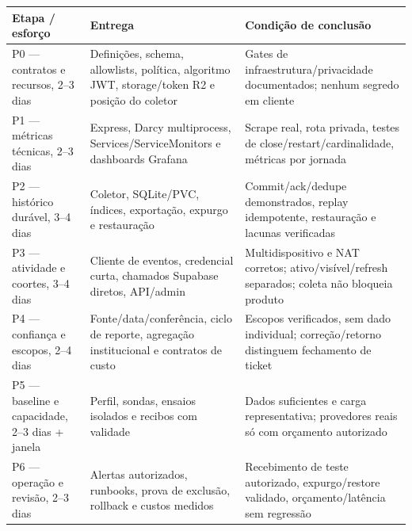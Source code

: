\documentclass[10pt,a4paper]{article}
\begin{document}
{\def\LTcaptype{none} %
\small
{}
\begin{longtable}[]{@{}
  >{\raggedright\arraybackslash}p{}
  >{\raggedright\arraybackslash}p{}
  >{\raggedright\arraybackslash}p{}@{}}
\toprule\noalign{}
\rowcolor{NFAccent}
\begin{minipage}[b]{\linewidth}\raggedright
Etapa / esforço
\end{minipage} & \begin{minipage}[b]{\linewidth}\raggedright
Entrega
\end{minipage} & \begin{minipage}[b]{\linewidth}\raggedright
Condição de conclusão
\end{minipage} \\
\midrule\noalign{}
\endhead
\bottomrule\noalign{}
\endlastfoot
P0 --- contratos e recursos, 2--3 dias & Definições, schema, allowlists,
política, algoritmo JWT, storage/token R2 e posição do coletor & Gates
de infraestrutura/privacidade documentados; nenhum segredo em cliente \\
P1 --- métricas técnicas, 2--3 dias & Express, Darcy multiprocess,
Services/ServiceMonitors e dashboards Grafana & Scrape real, rota
privada, testes de close/restart/cardinalidade, métricas por jornada \\
P2 --- histórico durável, 3--4 dias & Coletor, SQLite/PVC, índices,
exportação, expurgo e restauração & Commit/ack/dedupe demonstrados,
replay idempotente, restauração e lacunas verificadas \\
P3 --- atividade e coortes, 3--4 dias & Cliente de eventos, credencial
curta, chamados Supabase diretos, API/admin & Multidispositivo e NAT
corretos; ativo/visível/refresh separados; coleta não bloqueia
produto \\
P4 --- confiança e escopos, 2--4 dias & Fonte/data/conferência, ciclo de
reporte, agregação institucional e contratos de custo & Escopos
verificados, sem dado individual; correção/retorno distinguem fechamento
de ticket \\
P5 --- baseline e capacidade, 2--3 dias + janela & Perfil, sondas,
ensaios isolados e recibos com validade & Dados suficientes e carga
representativa; provedores reais só com orçamento autorizado \\
P6 --- operação e revisão, 2--3 dias & Alertas autorizados, runbooks,
prova de exclusão, rollback e custos medidos & Recebimento de teste
autorizado, expurgo/restore validado, orçamento/latência sem
regressão \\
\end{longtable}
}
\end{document}
